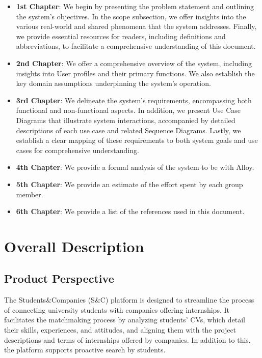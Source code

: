\documentclass{article}
\begin{document}
\begin{itemize}
    \item \textbf{1st Chapter}: We begin by presenting the problem statement and outlining the system's objectives. In the scope subsection, we offer insights into the various real-world and shared phenomena that the system addresses. Finally, we provide essential resources for readers, including definitions and abbreviations, to facilitate a comprehensive understanding of this document.
    
    \item \textbf{2nd Chapter}: We offer a comprehensive overview of the system, including insights into User profiles and their primary functions. We also establish the key domain assumptions underpinning the system's operation.
    
    \item \textbf{3rd Chapter}: We delineate the system's requirements, encompassing both functional and non-functional aspects. In addition, we present Use Case Diagrams that illustrate system interactions, accompanied by detailed descriptions of each use case and related Sequence Diagrams. Lastly, we establish a clear mapping of these requirements to both system goals and use cases for comprehensive understanding.
    
    \item \textbf{4th Chapter}: We provide a formal analysis of the system to be with Alloy.
    
    \item \textbf{5th Chapter}: We provide an estimate of the effort spent by each group member.
    
    \item \textbf{6th Chapter}: We provide a list of the references used in this document.
\end{itemize}

\section{Overall Description}
\subsection{Product Perspective}
The Students\&Companies (S\&C) platform is designed to streamline the process of connecting university students with companies offering internships. It facilitates the matchmaking process by analyzing students’ CVs, which detail their skills, experiences, and attitudes, and aligning them with the project descriptions and terms of internships offered by companies. In addition to this, the platform supports proactive search by students.
\end{document}

